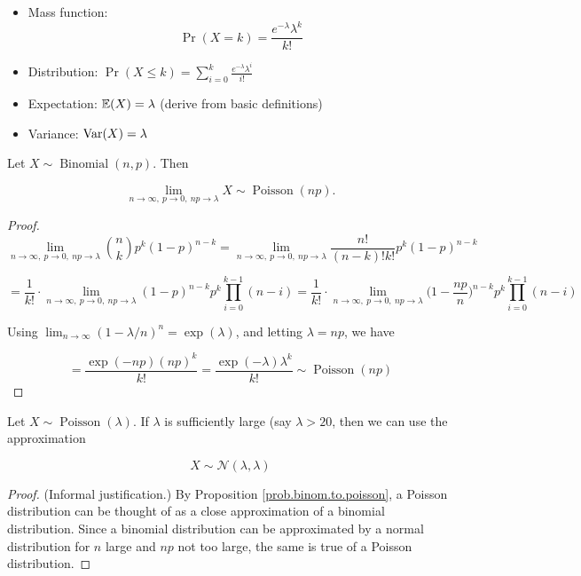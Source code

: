 \begin{itemize}

\item Mass function: \[\Pr(X = k) =  \frac{e^{-\lambda}\lambda^k}{k!} \]

\item Distribution: \(\Pr(X \leq k) = \sum_{i=0}^k  \frac{e^{-\lambda}\lambda^i}{i!}  \)

\item Expectation: \(\E(X) = \lambda \) (derive from basic definitions)

\item Variance: \(\Var(X) = \lambda\)

\end{itemize}

\begin{proposition}\label{prob.binom.to.poisson}Let \(X \sim \operatorname{Binomial}(n, p)\). Then

\[
\lim_{n \to \infty, \ p \to 0, \ np \to \lambda} X \sim \operatorname{Poisson}(np).
\]

\end{proposition}

\begin{proof}
\[
\lim_{n \to \infty, \ p \to 0, \ np \to \lambda} \binom{n}{k}p^k(1-p)^{n-k} = \lim_{n \to \infty, \ p \to 0, \ np \to \lambda} \frac{n!}{(n-k)!k!} p^k(1-p)^{n-k} 
\]

\[
= \frac{1}{k!} \cdot \lim_{n \to \infty, \ p \to 0, \ np \to \lambda}  (1-p)^{n-k} p^k \prod_{i=0}^{k-1} (n-i)  = \frac{1}{k!} \cdot \lim_{n \to \infty, \ p \to 0, \ np \to \lambda}  \bigg(1-\frac{np}{n} \bigg)^{n-k} p^k \prod_{i=0}^{k-1} (n-i) 
\]

Using \(\lim_{n \to \infty} (1 - \lambda/n)^n = \exp(\lambda) \), and letting \(\lambda =np\), we have

\[
= \frac{\exp(-np)(np)^k}{k!} = \boxed{\frac{\exp(-\lambda)\lambda^k}{k!} } \sim \operatorname{Poisson}(np)
\]
\end{proof}

\begin{proposition}\label{prob.poisson.to.normal}
Let \(X \sim \operatorname{Poisson}(\lambda)\). If \(\lambda\) is sufficiently large (say \(\lambda > 20\), then we can use the approximation

\[
X \sim \mathcal{N}(\lambda, \lambda)
\]

\end{proposition}

\begin{proof}
(Informal justification.) By Proposition \ref{prob.binom.to.poisson}, a Poisson distribution can be thought of as a close approximation of a binomial distribution. Since a binomial distribution can be approximated by a normal distribution for \(n\) large and \(np\) not too large, the same is true of a Poisson distribution.
\end{proof}

